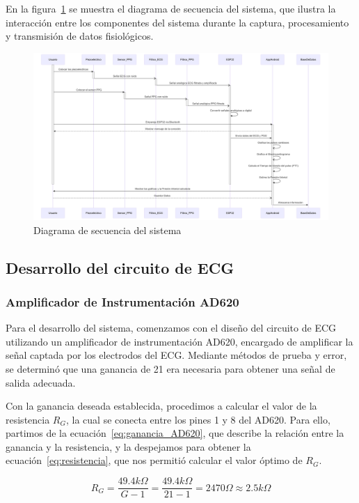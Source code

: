    En la figura~\ref{fig:Diagrama_Secuencia} se muestra el diagrama de secuencia del sistema, que ilustra la interacción entre los componentes del sistema durante la captura, procesamiento y transmisión de datos fisiológicos.

    \begin{figure}[H]
        \centering
        \includegraphics[width=1\textwidth]{img/Desarrollo/diagrama_secuencia.png}
        \caption{Diagrama de secuencia del sistema}
        \label{fig:Diagrama_Secuencia}
    \end{figure}

    \subsection{Desarrollo del circuito de ECG}
        \subsubsection{Amplificador de Instrumentación AD620}
            Para el desarrollo del sistema, comenzamos con el diseño del circuito de ECG utilizando un amplificador de instrumentación AD620, encargado de amplificar la señal captada por los electrodos del ECG. Mediante métodos de prueba y error, se determinó que una ganancia de 21 era necesaria para obtener una señal de salida adecuada.

            Con la ganancia deseada establecida, procedimos a calcular el valor de la resistencia $R_G$, la cual se conecta entre los pines 1 y 8 del AD620. Para ello, partimos de la ecuación~\ref{eq:ganancia_AD620}, que describe la relación entre la ganancia y la resistencia, y la despejamos para obtener la ecuación~\ref{eq:resistencia}, que nos permitió calcular el valor óptimo de $R_G$.

            \begin{equation}
                \label{eq:resistencia}
                R_G = \frac{49.4 k\Omega}{G - 1} = \frac{49.4 k\Omega}{21 - 1} = 2470 \Omega \approx 2.5 k\Omega
            \end{equation}

